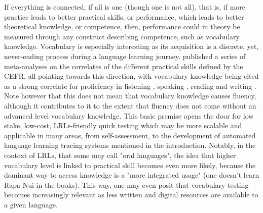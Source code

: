 If everything is connected, if all is one (though one is not all), that is, if more practice leads to better practical skills, or performance, which leads to better theoretical knowledge, or competence, then, performance could in theory be measured through any construct describing competence, such as vocabulary knowledge. Vocabulary is especially interesting as its acquisition is a discrete, yet, never-ending process during a language learning journey. \textcite{eun_hee_jeon_understanding_2022} published a series of meta-analyses on the correlates of the different practical skills defined by the CEFR, all pointing towards this direction, with vocabulary knowledge being cited as a strong correlate for proficiency in listening \parencite{innami_meta-analysis_2022}, speaking \parencite{jeon_meta-analysis_2022}, reading \parencite{jeon_updated_2022} and writing \parencite{kojima_meta-analysis_2022}. Note however that this does not mean that vocabulary knowledge causes fluency, although it contributes to it to the extent that fluency does not come without an advanced level vocabulary knowledge. This basic premise opens the door for low stake, low-cost, LRLs-friendly quick testing which may be more scalable and applicable in many areas, from self-assessment, to the development of automated language learning tracing systems mentioned in the introduction. Notably, in the context of LRLs, that some may call "oral languages", the idea that higher vocabulary level is linked to practical skill becomes even more likely, because the dominant way to access knowledge is a "more integrated usage" (one doesn't learn Rapa Nui in the books). This way, one may even posit that vocabulary testing becomes increasingly relevant as less written and digital resources are available to a given language. 

